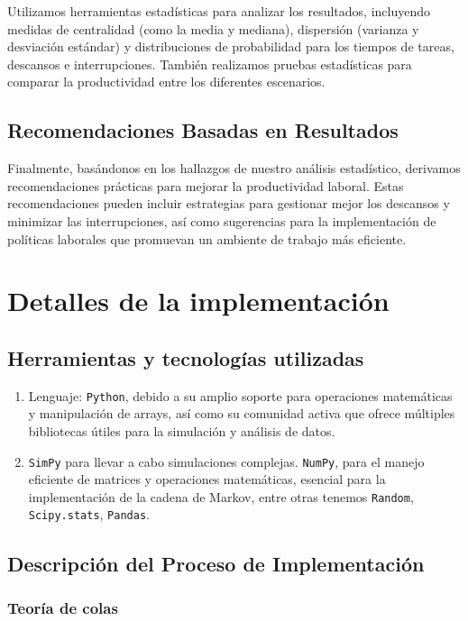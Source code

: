 \documentclass[10pt,a4paper,twocolumn]{article}
\begin{document}
Utilizamos herramientas estadísticas para analizar los resultados, incluyendo medidas de centralidad (como la media y mediana), dispersión (varianza y desviación estándar) y distribuciones de probabilidad para los tiempos de tareas, descansos e interrupciones. También realizamos pruebas estadísticas para comparar la productividad entre los diferentes escenarios.    


\subsection{Recomendaciones Basadas en Resultados}

Finalmente, basándonos en los hallazgos de nuestro análisis estadístico, derivamos recomendaciones prácticas para mejorar la productividad laboral. Estas recomendaciones pueden incluir estrategias para gestionar mejor los descansos y minimizar las interrupciones, así como sugerencias para la implementación de políticas laborales que promuevan un ambiente de trabajo más eficiente.

\section{Detalles de la implementación}

\subsection{Herramientas y tecnolog\'ias utilizadas}

\begin{enumerate}
    \item Lenguaje: \texttt{Python}, debido a su amplio soporte para operaciones matemáticas y manipulación de arrays, así como su comunidad activa que ofrece múltiples bibliotecas útiles para la simulación y análisis de datos.
    \item \texttt{SimPy} para llevar a cabo simulaciones complejas. \texttt{NumPy}, para el manejo eficiente de matrices y operaciones matemáticas, esencial para la implementación de la cadena de Markov, entre otras tenemos \texttt{Random}, \texttt{Scipy.stats}, \texttt{Pandas}.
\end{enumerate}

\subsection{Descripción del Proceso de Implementación}

\subsubsection{Teor\'ia de colas}
\end{document}
